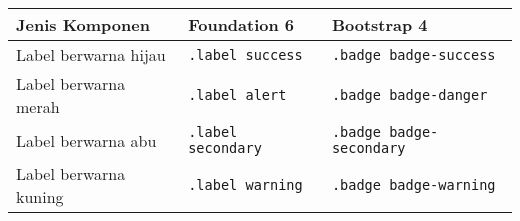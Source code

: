 \begin{tabular}{| p{} | p{} | p{} |} 
	\hline
	\textbf{Jenis Komponen} & \textbf{Foundation 6} & \textbf{Bootstrap 4}  \\ [0.5ex] 
	\hline		
	Label berwarna hijau & \texttt{.label success} & \texttt{.badge badge-success} \\
	Label berwarna merah & \texttt{.label alert} & \texttt{.badge badge-danger} \\
	Label berwarna abu & \texttt{.label secondary} & \texttt{.badge badge-secondary} \\
	Label berwarna kuning & \texttt{.label warning} & \texttt{.badge badge-warning} \\ [1ex]
	\hline
\end{tabular}
 


